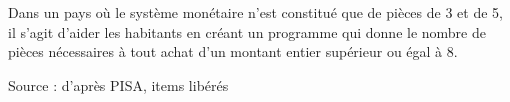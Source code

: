 
Dans un pays où le système monétaire n’est constitué que de pièces de 3 et de 5, il s’agit d’aider les habitants en créant un programme  qui donne le nombre de pièces nécessaires à tout achat d’un montant entier supérieur ou égal à 8.

\hfill{{\footnotesize Source : d’après PISA, items libérés}}